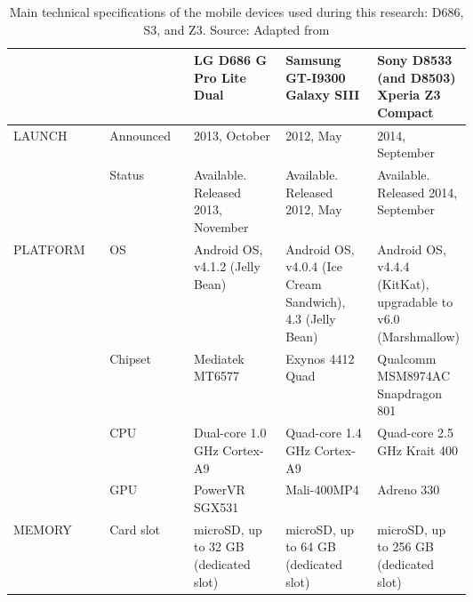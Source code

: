 \begin{longtable}{llp{0.2\linewidth}p{0.2\linewidth}p{0.2\linewidth}}
	\caption{Main technical specifications of the mobile devices used during this research: D686, S3, and Z3. Source: Adapted from \cite{GSMARENA2017-lg-s3-z3}} \\ \hline
	&               & LG D686 G Pro Lite Dual                              & Samsung GT-I9300 Galaxy SIII                                                                  & Sony D8533 (and D8503) Xperia Z3 Compact                                                          \\ \hline \endhead
	LAUNCH   & Announced     & 2013, October                                   & 2012, May                                                                                   & 2014, September                                                                                                \\
	& Status        & Available. Released 2013, November              & Available. Released 2012, May                                                               & Available. Released 2014, September                                                                            \\ \hline
	PLATFORM & OS            & Android OS, v4.1.2 (Jelly Bean)                 & Android OS, v4.0.4 (Ice Cream Sandwich), 4.3 (Jelly Bean)                                   & Android OS, v4.4.4 (KitKat), upgradable to v6.0 (Marshmallow)                                                  \\
	& Chipset       & Mediatek MT6577                                 & Exynos 4412 Quad                                                                            & Qualcomm MSM8974AC Snapdragon 801                                                                              \\
	& CPU           & Dual-core 1.0 GHz Cortex-A9                     & Quad-core 1.4 GHz Cortex-A9                                                                 & Quad-core 2.5 GHz Krait 400                                                                                    \\
	& GPU           & PowerVR SGX531                                  & Mali-400MP4                                                                                 & Adreno 330                                                                                                     \\ \hline
	MEMORY   & Card slot     & microSD, up to 32 GB (dedicated slot)           & microSD, up to 64 GB (dedicated slot)                                                       & microSD, up to 256 GB (dedicated slot)                                                                         \\

\end{longtable}
